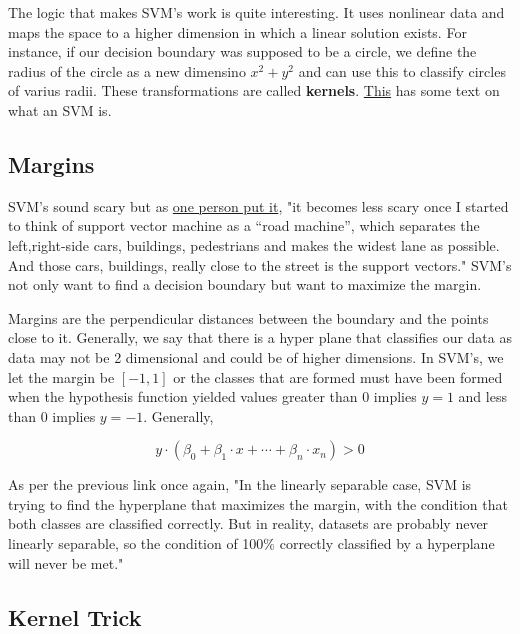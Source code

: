 The logic that makes SVM's work is quite interesting. It uses nonlinear data and maps the space to a higher dimension in which a linear solution exists. For instance, if our decision boundary was supposed to be a circle, we define the radius of the circle as a new dimensino $x^2 + y^2$ and can use this to classify circles of varius radii. These transformations are called \textbf{kernels}. \href{https://towardsdatascience.com/support-vector-machine-introduction-to-machine-learning-algorithms-934a444fca47}{This} has some text on what an SVM is. 

\subsection{Margins}

SVM's sound scary but as \href{https://towardsdatascience.com/support-vector-machine-simply-explained-fee28eba5496}{one person put it}, "it becomes less scary once I started to think of support vector machine as a “road machine”, which separates the left,right-side cars, buildings, pedestrians and makes the widest lane as possible. And those cars, buildings, really close to the street is the support vectors." SVM's not only want to find a decision boundary but want to maximize the margin.

Margins are the perpendicular distances between the boundary and the points close to it. Generally, we say that there is a hyper plane that classifies our data as data may not be 2 dimensional and could be of higher dimensions. In SVM's, we let the margin be $[-1, 1]$ or the classes that are formed must have been formed when the hypothesis function yielded values greater than 0 implies $y=1$ and less than 0 implies $y=-1$. Generally,

\begin{equation}
    y\cdot (\beta_0 + \beta_1 \cdot x +  \cdots + \beta_n \cdot x_n) > 0
\end{equation}

As per the previous link once again, "In the linearly separable case, SVM is trying to find the hyperplane that maximizes the margin, with the condition that both classes are classified correctly. But in reality, datasets are probably never linearly separable, so the condition of 100\% correctly classified by a hyperplane will never be met."

\subsection{Kernel Trick}

